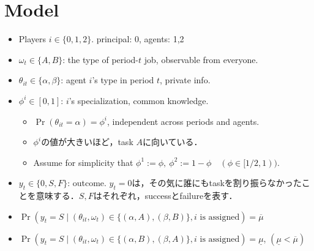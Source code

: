 \documentclass[11pt,a4paper,dvipdfmx]{article}
\renewcommand{\bar}{\overline}
\newcommand{\1}{\mathbbm{1}}
\begin{document}
\section*{Model}
\begin{itemize}
	\item Players $i \in \{0,1,2\}$. principal: 0, agents: 1,2
	\item $\omega_t \in \{A, B\}$: the type of period-$t$ job, observable from everyone.
	\item $\theta_{it} \in \{\alpha, \beta\}$: agent $i$'s type in period $t$, private info.
	\item $\phi^i \in [0,1]$: $i$'s specialization, common knowledge.
	\begin{itemize}
		\item $\Pr(\theta_{it} = \alpha) = \phi^i$, independent across periods and agents.
		\item $\phi^i$の値が大きいほど，task $A$に向いている．
		\item Assume for simplicity that $\phi^1 := \phi, \ \phi^2 := 1 - \phi \quad (\phi \in [1/2,1))$.
	\end{itemize}
	\item $y_t \in \{0,S,F\}$: outcome. $y_t=0$は，その気に誰にもtaskを割り振らなかったことを意味する．$S, F$はそれぞれ，successとfailureを表す．
	\item $\Pr(y_t = S \mid (\theta_{it}, \omega_t) \in \{(\alpha, A), (\beta, B) \}, \text{$i$ is assigned}) = \bar{\mu}$
	\item $\Pr(y_t = S \mid (\theta_{it}, \omega_t) \in \{(\alpha, B), (\beta, A) \}, \text{$i$ is assigned}) = \underline{\mu}$, $(\underline{\mu} < \bar{\mu})$
	

\end{itemize}
\end{document}
